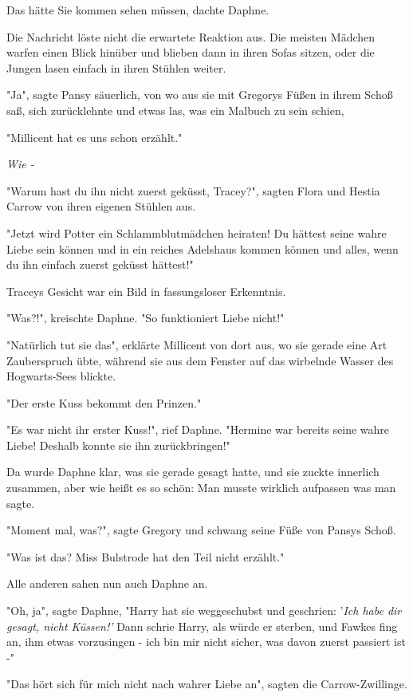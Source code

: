 {Das hätte Sie kommen sehen müssen, dachte Daphne.

Die Nachricht löste nicht die erwartete Reaktion aus. Die meisten Mädchen warfen einen Blick hinüber und blieben dann in ihren Sofas sitzen, oder die Jungen lasen einfach in ihren Stühlen weiter.

"Ja", sagte Pansy säuerlich, von wo aus sie mit Gregorys Füßen in ihrem Schoß saß, sich zurücklehnte und etwas las, was ein Malbuch zu sein schien,

"Millicent hat es uns schon erzählt."

\emph{Wie -}

"Warum hast du ihn nicht zuerst geküsst, Tracey?", sagten Flora und Hestia Carrow von ihren eigenen Stühlen aus.

"Jetzt wird Potter ein Schlammblutmädchen heiraten! Du hättest seine wahre Liebe sein können und in ein reiches Adelshaus kommen können und alles, wenn du ihn einfach zuerst geküsst hättest!"

Traceys Gesicht war ein Bild in fassungsloser Erkenntnis.

"Was?!", kreischte Daphne. "So funktioniert Liebe nicht!"

"Natürlich tut sie das", erklärte Millicent von dort aus, wo sie gerade eine Art Zauberspruch übte, während sie aus dem Fenster auf das wirbelnde Wasser des Hogwarts-Sees blickte.

"Der erste Kuss bekommt den Prinzen."

"Es war nicht ihr erster Kuss!", rief Daphne. "Hermine war bereits seine wahre Liebe! Deshalb konnte sie ihn zurückbringen!"

Da wurde Daphne klar, was sie gerade gesagt hatte, und sie zuckte innerlich zusammen, aber wie heißt es so schön: Man musste wirklich aufpassen was man sagte.

"Moment mal, was?", sagte Gregory und schwang seine Füße von Pansys Schoß.

"Was ist das? Miss Bulstrode hat den Teil nicht erzählt."

Alle anderen sahen nun auch Daphne an.

"Oh, ja", sagte Daphne, "Harry hat sie weggeschubst und geschrien: '\emph{Ich habe dir gesagt, nicht Küssen!'} Dann schrie Harry, als würde er sterben, und Fawkes fing an, ihm etwas vorzusingen - ich bin mir nicht sicher, was davon zuerst passiert ist -"

"Das hört sich für mich nicht nach wahrer Liebe an", sagten die Carrow-Zwillinge.

}
